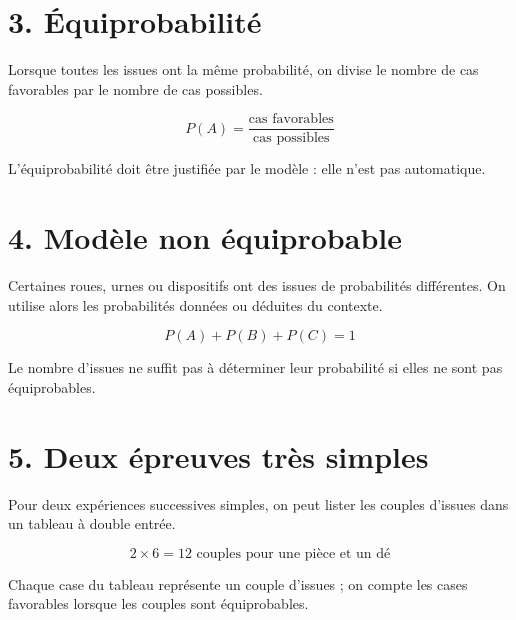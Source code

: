
\section{3. Équiprobabilité}
Lorsque toutes les issues ont la même probabilité, on divise le nombre de cas favorables par le nombre de cas possibles.

\[
P(A)=\dfrac{\text{cas favorables}}{\text{cas possibles}}
\]

\begin{exemple}
L’équiprobabilité doit être justifiée par le modèle : elle n’est pas automatique.
\end{exemple}

\section{4. Modèle non équiprobable}
Certaines roues, urnes ou dispositifs ont des issues de probabilités différentes. On utilise alors les probabilités données ou déduites du contexte.

\[
P(A)+P(B)+P(C)=1
\]

\begin{exemple}
Le nombre d’issues ne suffit pas à déterminer leur probabilité si elles ne sont pas équiprobables.
\end{exemple}

\section{5. Deux épreuves très simples}
Pour deux expériences successives simples, on peut lister les couples d’issues dans un tableau à double entrée.

\[
2\times6=12\text{ couples pour une pièce et un dé}
\]

\begin{exemple}
Chaque case du tableau représente un couple d’issues ; on compte les cases favorables lorsque les couples sont équiprobables.
\end{exemple}



